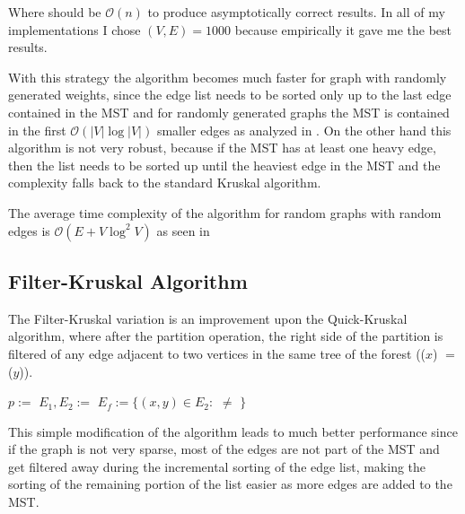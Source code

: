 \documentclass{article}
\begin{document}
Where  should be $\mathcal{O}(n)$ to produce asymptotically correct results. In all of my implementations I chose $(V, E)=1000$ because empirically it gave me the best results.

With this strategy the algorithm becomes much faster for graph with randomly generated weights, since the edge list needs to be sorted only up to the last edge contained in the MST and for randomly generated graphs the MST is contained in the first $\mathcal{O}(\lvert V\rvert\log \lvert V\rvert)$ smaller edges as analyzed in \cite{janson1993birth}. On the other hand this algorithm is not very robust, because if the MST has at least one heavy edge, then the list needs to be sorted up until the heaviest edge in the MST and the complexity falls back to the standard Kruskal algorithm.

The average time complexity of the algorithm for random graphs with random edges is $\mathcal{O}(E + V \log^2 V)$ as seen in \cite{incremental}

\subsection{Filter-Kruskal Algorithm}

The Filter-Kruskal variation is an improvement upon the Quick-Kruskal algorithm, where after the partition operation, the right side of the partition is filtered of any edge adjacent to two vertices in the same tree of the forest (($x$) $ = $ ($y$)).

\begin{algorithm}
    \begin{algorithmic}
                \State \Return {}
            \EndIf
            \State $p := $ 
            \State $E_1, E_2 := $ 
            \State {}
                \State $E_f := \{(x, y) \in E_2 : $  $\neq$ $\}$ 
                \State {}
            \EndIf
        \EndFunction
    \end{algorithmic}
\end{algorithm}

This simple modification of the algorithm leads to much better performance since if the graph is not very sparse, most of the edges are not part of the MST and get filtered away during the incremental sorting of the edge list, making the sorting of the remaining portion of the list easier as more edges are added to the MST.
\end{document}
